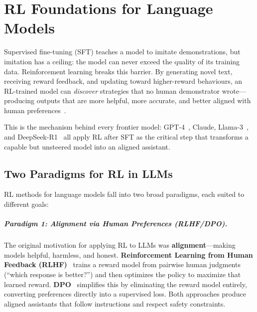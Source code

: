\chapter{RL Foundations for Language Models}
\label{rl-foundations-for-language-models}

Supervised fine-tuning (SFT) teaches a model to imitate demonstrations, but imitation has a ceiling: the model can never exceed the quality of its training data. Reinforcement learning breaks this barrier. By generating novel text, receiving reward feedback, and updating toward higher-reward behaviours, an RL-trained model can \emph{discover} strategies that no human demonstrator wrote---producing outputs that are more helpful, more accurate, and better aligned with human preferences~\cite{ouyang2022training}.

This is the mechanism behind every frontier model: GPT-4~\cite{openai2023gpt4}, Claude, Llama-3~\cite{grattafiori2024llama3}, and DeepSeek-R1~\cite{deepseek2025r1} all apply RL after SFT as the critical step that transforms a capable but unsteered model into an aligned assistant.

\section{Two Paradigms for RL in LLMs}
\label{two-paradigms-rl-llms}

RL methods for language models fall into two broad paradigms, each suited to different goals:

\paragraph{Paradigm 1: Alignment via Human Preferences (RLHF/DPO).}
The original motivation for applying RL to LLMs was \textbf{alignment}---making models helpful, harmless, and honest. \textbf{Reinforcement Learning from Human Feedback (RLHF)}~\cite{ouyang2022training, ziegler2019fine, christiano2017deep} trains a reward model from pairwise human judgments (``which response is better?'') and then optimizes the policy to maximize that learned reward. \textbf{DPO}~\cite{rafailov2023direct} simplifies this by eliminating the reward model entirely, converting preferences directly into a supervised loss. Both approaches produce aligned assistants that follow instructions and respect safety constraints.

